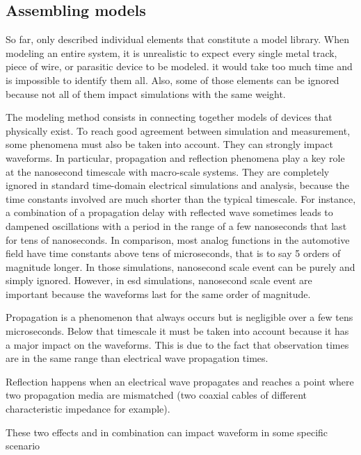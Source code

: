 \subsection{Assembling models}

So far, only described individual elements that constitute a model library.
When modeling an entire system, it is unrealistic to expect every single metal track, piece of wire, or parasitic device to be modeled.
it would take too much time and is impossible to identify them all.
Also, some of those elements can be ignored because not all of them impact simulations with the same weight.

%
The modeling method consists in connecting together models of devices that physically exist.
To reach good agreement between simulation and measurement, some phenomena must also be taken into account.
They can strongly impact waveforms.
In particular, propagation and reflection phenomena play a key role at the nanosecond timescale with macro-scale systems.
They are completely ignored in standard time-domain electrical simulations and analysis, because the time constants involved are much shorter than the typical timescale.
For instance, a combination of a propagation delay with reflected wave sometimes leads to dampened oscillations with a period in the range of a few nanoseconds that last for tens of nanoseconds.
In comparison, most analog functions in the automotive field have time constants above tens of microseconds, that is to say 5 orders of magnitude longer.
In those simulations, nanosecond scale event can be purely and simply ignored.
However, in \gls{esd} simulations, nanosecond scale event are important because the waveforms last for the same order of magnitude.

Propagation is a phenomenon that always occurs but is negligible over a few tens microseconds.
Below that timescale it must be taken into account because it has a major impact on the waveforms.
This is due to the fact that observation times are in the same range than electrical wave propagation times.

Reflection happens when an electrical wave propagates and reaches a point where two propagation media are mismatched (two coaxial cables of different characteristic impedance for example).

These two effects and in combination can impact waveform in some specific scenario

